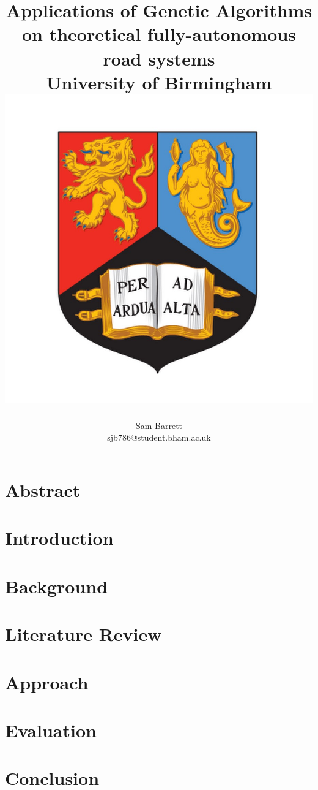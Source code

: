\documentclass[a4paper,11pt]{report}
\title{
	{Applications of Genetic Algorithms on theoretical fully-autonomous road systems} \\
	{\large University of Birmingham} \\ 
	{\includegraphics[scale=0.3]{uobcrest.jpg}}
}
\author{Sam Barrett \\ sjb786@student.bham.ac.uk}
\begin{document}
\maketitle
\listoftodos
\tableofcontents
\chapter*{Abstract}\label{chap:Abs}

\chapter{Introduction}\label{chap:Intro}

\chapter{Background}\label{chap:Background}

\chapter{Literature Review}\label{chap:LitRev}

\chapter{Approach}\label{chap:ClassicalApproach}

\chapter{Evaluation}\label{chap:Eval}

\chapter{Conclusion}\label{chap:Conclusion}




\end{document}
